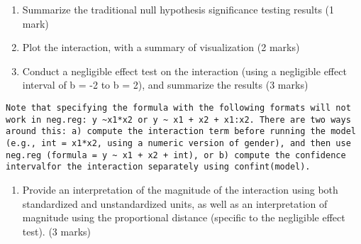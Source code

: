 \documentclass[
]{article}
\providecommand{\tightlist}{%
  \setlength{\itemsep}{0pt}\setlength{\parskip}{0pt}}
\begin{document}
\begin{enumerate}
\def\labelenumi{\arabic{enumi})}
\setcounter{enumi}{1}
\tightlist
\item
  Summarize the traditional null hypothesis significance testing results
  (1 mark)
\item
  Plot the interaction, with a summary of visualization (2 marks)
\item
  Conduct a negligible effect test on the interaction (using a
  negligible effect interval of b = -2 to b = 2), and summarize the
  results (3 marks)
\end{enumerate}

\begin{verbatim}
Note that specifying the formula with the following formats will not work in neg.reg: y ~x1*x2 or y ~ x1 + x2 + x1:x2. There are two ways around this: a) compute the interaction term before running the model (e.g., int = x1*x2, using a numeric version of gender), and then use neg.reg (formula = y ~ x1 + x2 + int), or b) compute the confidence intervalfor the interaction separately using confint(model).
\end{verbatim}

\begin{enumerate}
\def\labelenumi{\arabic{enumi})}
\setcounter{enumi}{4}
\tightlist
\item
  Provide an interpretation of the magnitude of the interaction using
  both standardized and unstandardized units, as well as an
  interpretation of magnitude using the proportional distance (specific
  to the negligible effect test). (3 marks)
\end{enumerate}
\end{document}
